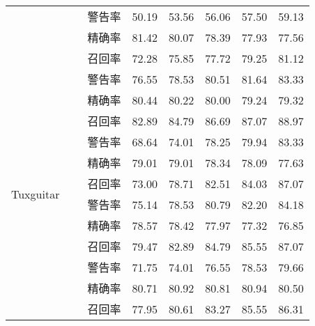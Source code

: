 \begin{table}
\begin{tabular}{cccccccc}
&~\multirow{3}{*}{无演化属性(\%)}    
&    警告率       & 50.19 & 53.56 & 56.06 & 57.50 & 59.13 \\
&  & 精确率       & 81.42 & 80.07 & 78.39 & 77.93 & 77.56 \\
&             & 召回率       & 72.28 & 75.85 & 77.72 & 79.25 & 81.12 \\
\hline
\multirow{12}{*}{Tuxguitar  }
&~\multirow{3}{*}{全部属性(\%)}
 &   警告率       & 76.55 & 78.53 & 80.51 & 81.64 & 83.33 \\
&     & 精确率       & 80.44 & 80.22 & 80.00 & 79.24 & 79.32 \\
 &             & 召回率       & 82.89 & 84.79 & 86.69 & 87.07 & 88.97 \\
\cline{2-8}
  &~\multirow{3}{*}{无代码属性(\%)}
& 警告率       & 68.64 & 74.01 & 78.25 & 79.94 & 83.33 \\
 & & 精确率       & 79.01 & 79.01 & 78.34 & 78.09 & 77.63 \\
 &             & 召回率       & 73.00 & 78.71 & 82.51 & 84.03 & 87.07 \\
  \cline{2-8}
&~\multirow{3}{*}{无上下文属性(\%)}
&    警告率       & 75.14 & 78.53 & 80.79 & 82.20 & 84.18 \\
&    & 精确率       & 78.57 & 78.42 & 77.97 & 77.32 & 76.85 \\
 &             & 召回率       & 79.47 & 82.89 & 84.79 & 85.55 & 87.07 \\
\cline{2-8}
&~\multirow{3}{*}{无演化属性 (\%)}
&    警告率       & 71.75 & 74.01 & 76.55 & 78.53 & 79.66 \\
 & & 精确率       & 80.71 & 80.92 & 80.81 & 80.94 & 80.50 \\
  &             & 召回率       & 77.95 & 80.61 & 83.27 & 85.55 & 86.31\\
\bottomrule[1.5pt]
\end{tabular}
\end{table}

